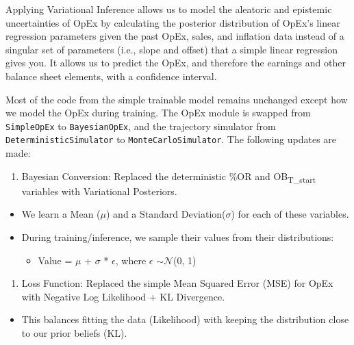 \documentclass[12pt,a4paper]{article}
\begin{document}
Applying Variational Inference allows us to model the aleatoric and
epistemic uncertainties of OpEx by calculating the posterior
distribution of OpEx's linear regression parameters given the past OpEx,
sales, and inflation data instead of a singular set of parameters (i.e.,
slope and offset) that a simple linear regression gives you. It allows
us to predict the OpEx, and therefore the earnings and other balance
sheet elements, with a confidence interval.

Most of the code from the simple trainable model remains unchanged
except how we model the OpEx during training. The OpEx module is swapped
from \texttt{SimpleOpEx} to \texttt{BayesianOpEx}, and the trajectory
simulator from \texttt{DeterministicSimulator} to
\texttt{MonteCarloSimulator}. The following updates are
made:

\begin{enumerate}
\def\labelenumi{\arabic{enumi}.}
\item
  Bayesian Conversion: Replaced the deterministic \%OR and
  OB\textsubscript{T\_start} variables with Variational Posteriors.
\end{enumerate}

\begin{itemize}
\item
  We learn a Mean ($\mu$) and a Standard Deviation($\sigma$) for each of these
  variables.
\item
  During training/inference, we sample their values from their
  distributions:

  \begin{itemize}
  \item
    Value = $\mu$ + $\sigma$ * $\epsilon$, where $\epsilon$ $\sim$$\mathcal{N}$(0, 1)
  \end{itemize}
\end{itemize}

\begin{enumerate}
\def\labelenumi{\arabic{enumi}.}
\setcounter{enumi}{1}
\item
  Loss Function: Replaced the simple Mean Squared Error (MSE) for OpEx
  with Negative Log Likelihood + KL Divergence.
\end{enumerate}

\begin{itemize}
\item
  This balances fitting the data (Likelihood) with keeping the
  distribution close to our prior beliefs (KL).
\end{itemize}
\end{document}
